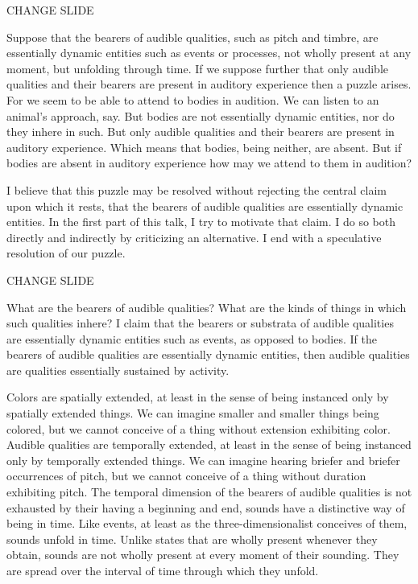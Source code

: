 \documentclass[12pt]{article}
\title{\mytitle}
\author{\myauthor}
\date{} %
\begin{document}
\maketitle

\setlength{\parindent}{1em}


CHANGE SLIDE

Suppose that the bearers of audible qualities, such as pitch and timbre, are essentially dynamic entities such as events or processes, not wholly present at any moment, but unfolding through time. If we suppose further that only audible qualities and their bearers are present in auditory experience then a puzzle arises. For we seem to be able to attend to bodies in audition. We can listen to an animal’s approach, say. But bodies are not essentially dynamic entities, nor do they inhere in such. But only audible qualities and their bearers are present in auditory experience. Which means that bodies, being neither, are absent. But if bodies are absent in auditory experience how may we attend to them in audition?

I believe that this puzzle may be resolved without rejecting the central claim upon which it rests, that the bearers of audible qualities are essentially dynamic entities. In the first part of this talk, I try to motivate that claim. I do so both directly and indirectly by criticizing an alternative. I end with a speculative resolution of our puzzle.

CHANGE SLIDE

What are the bearers of audible qualities? What are the kinds of things in which such qualities inhere? I claim that the bearers or substrata of audible qualities are essentially dynamic entities such as events, as opposed to bodies. If the bearers of audible qualities are essentially dynamic entities, then audible qualities are qualities essentially sustained by activity.

Colors are spatially extended, at least in the sense of being instanced only by spatially extended things. We can imagine smaller and smaller things being colored, but we cannot conceive of a thing without extension exhibiting color. Audible qualities are temporally extended, at least in the sense of being instanced only by temporally extended things. We can imagine hearing briefer and briefer occurrences of pitch, but we cannot conceive of a thing without duration exhibiting pitch. The temporal dimension of the bearers of audible qualities is not exhausted by their having a beginning and end, sounds have a distinctive way of being in time. Like events, at least as the three-dimensionalist conceives of them, sounds unfold in time. Unlike states that are wholly present whenever they obtain, sounds are not wholly present at every moment of their sounding. They are spread over the interval of time through which they unfold.
\end{document}

